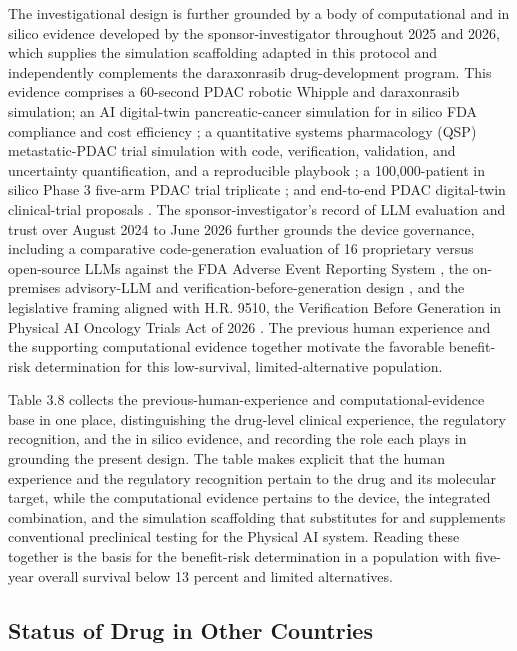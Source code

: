The investigational design is further grounded by a body of computational and
in silico evidence developed by the sponsor-investigator throughout 2025 and 2026,
which supplies the simulation scaffolding adapted in this protocol and independently
complements the daraxonrasib drug-development program. This evidence comprises a
60-second PDAC robotic Whipple and daraxonrasib simulation; an AI digital-twin
pancreatic-cancer simulation for in silico FDA compliance and cost efficiency
\cite{fdadigtwinpc}; a quantitative systems pharmacology (QSP) metastatic-PDAC trial
simulation with code, verification, validation, and uncertainty quantification, and
a reproducible playbook \cite{qspmetpancre}; a 100,000-patient in silico Phase 3
five-arm PDAC trial triplicate \cite{chatgpt100kp}; and end-to-end PDAC digital-twin
clinical-trial proposals \cite{pdacdigtwinp}. The sponsor-investigator's record of
LLM evaluation and trust over August 2024 to June 2026 further grounds the device
governance, including a comparative code-generation evaluation of 16 proprietary
versus open-source LLMs against the FDA Adverse Event Reporting System
\cite{llmcomp16fda}, the on-premises advisory-LLM and verification-before-generation
design \cite{clintrustpai}, and the legislative framing aligned with H.R. 9510, the
Verification Before Generation in Physical AI Oncology Trials Act of 2026
\cite{congress9510}. The previous human experience and the supporting computational
evidence together motivate the favorable benefit-risk determination for this
low-survival, limited-alternative population.

Table 3.8 collects the previous-human-experience and computational-evidence base in
one place, distinguishing the drug-level clinical experience, the regulatory
recognition, and the in silico evidence, and recording the role each plays in
grounding the present design. The table makes explicit that the human experience and
the regulatory recognition pertain to the drug and its molecular target, while the
computational evidence pertains to the device, the integrated combination, and the
simulation scaffolding that substitutes for and supplements conventional preclinical
testing for the Physical AI system. Reading these together is the basis for the
benefit-risk determination in a population with five-year overall survival below 13
percent and limited alternatives.



\subsection{Status of Drug in Other Countries}

